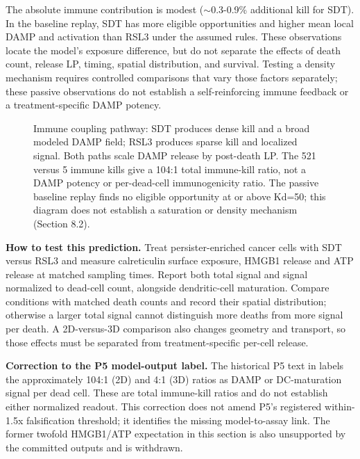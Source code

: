 \documentclass[11pt,twoside,openright]{report}
\begin{document}
The absolute immune contribution is modest ($\sim$0.3-0.9\% additional kill for SDT). In the baseline replay, SDT has more eligible opportunities and higher mean local DAMP and activation than RSL3 under the assumed rules. These observations locate the model's exposure difference, but do not separate the effects of death count, release LP, timing, spatial distribution, and survival. Testing a density mechanism requires controlled comparisons that vary those factors separately; these passive observations do not establish a self-reinforcing immune feedback or a treatment-specific DAMP potency.

\begin{figure}[tbp]
\setcounter{figure}{15}
\caption{Immune coupling pathway: SDT produces dense kill and a broad modeled DAMP field; RSL3 produces sparse kill and localized signal. Both paths scale DAMP release by post-death LP. The 521 versus 5 immune kills give a 104:1 total immune-kill ratio, not a DAMP potency or per-dead-cell immunogenicity ratio. The passive baseline replay finds no eligible opportunity at or above Kd=50; this diagram does not establish a saturation or density mechanism (Section 8.2).}
\label{fig:fig19_immune_coupling_flow}
\end{figure}

\textbf{How to test this prediction.} Treat persister-enriched cancer cells with SDT versus RSL3 and measure calreticulin surface exposure, HMGB1 release and ATP release at matched sampling times. Report both total signal and signal normalized to dead-cell count, alongside dendritic-cell maturation. Compare conditions with matched death counts and record their spatial distribution; otherwise a larger total signal cannot distinguish more deaths from more signal per death. A 2D-versus-3D comparison also changes geometry and transport, so those effects must be separated from treatment-specific per-cell release.

\textbf{Correction to the P5 model-output label.} The historical P5 text in  labels the approximately 104:1 (2D) and 4:1 (3D) ratios as DAMP or DC-maturation signal per dead cell. These are total immune-kill ratios and do not establish either normalized readout. This correction does not amend P5's registered within-1.5x falsification threshold; it identifies the missing model-to-assay link. The former twofold HMGB1/ATP expectation in this section is also unsupported by the committed outputs and is withdrawn.
\end{document}
